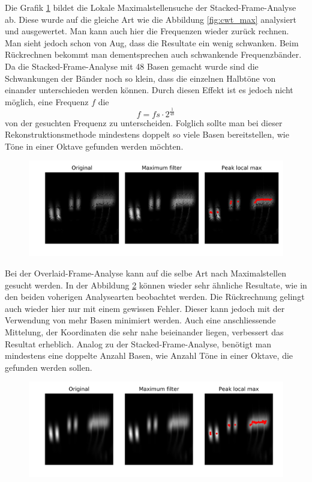 Die Grafik \ref{fig:stacked_max} bildet die Lokale Maximalstellensuche der Stacked-Frame-Analyse ab. Diese wurde auf die gleiche Art wie die Abbildung \ref{fig:cwt_max} analysiert und ausgewertet. Man kann auch hier die Frequenzen wieder zurück rechnen. Man sieht jedoch schon von Aug, dass die Resultate ein wenig schwanken. Beim Rückrechnen bekommt man dementsprechen auch schwankende Frequenzbänder. Da die Stacked-Frame-Analyse mit 48 Basen gemacht wurde sind die Schwankungen der Bänder noch so klein, dass die einzelnen Halbtöne von einander unterschieden werden können. Durch diesen Effekt ist es jedoch nicht möglich, eine Frequenz $f$ die 
\[f= fs\cdot 2^{\frac{1}{48}}\]  
von der gesuchten Frequenz zu unterscheiden. Folglich sollte man bei dieser Rekonstruktionsmethode mindestens doppelt so viele Basen bereitstellen, wie Töne in einer Oktave gefunden werden möchten. 
\begin{figure}[!ht]
	\centering
	\includegraphics[width=\linewidth]{papers/autotune/sections/frames/images/Stacked/dwtmaxima.jpg}
	\label{fig:stacked_max}
\end{figure}%


Bei der Overlaid-Frame-Analyse kann auf die selbe Art nach Maximalstellen gesucht werden. In der Abbildung \ref{fig:overlaid_max} können wieder sehr ähnliche Resultate, wie in den beiden voherigen Analysearten beobachtet werden. Die Rückrechnung gelingt auch wieder hier nur mit einem gewissen Fehler. Dieser kann jedoch mit der Verwendung von mehr Basen minimiert werden.  Auch eine anschliessende Mittelung, der Koordinaten die sehr nahe beieinander liegen, verbessert das Resultat erheblich. Analog zu der Stacked-Frame-Analyse, benötigt man mindestens eine doppelte Anzahl Basen, wie Anzahl Töne in einer Oktave, die gefunden werden sollen.
\begin{figure}[!ht]
	\centering
	\includegraphics[width=\linewidth]{papers/autotune/sections/frames/images/Overlaid/dwtmaxima.jpg}
	\label{fig:overlaid_max}
\end{figure}%

